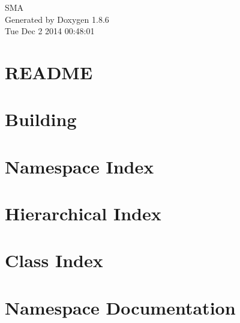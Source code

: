 \documentclass[twoside]{book}
\newcommand{\clearemptydoublepage}{%
  \newpage{\pagestyle{empty}\cleardoublepage}%
}
\begin{document}
\hypersetup{pageanchor=false}
\begin{titlepage}
\vspace*{7cm}
\begin{center}%
{\Large S\-M\-A }\\
\vspace*{1cm}
{\large Generated by Doxygen 1.8.6}\\
\vspace*{0.5cm}
{\small Tue Dec 2 2014 00:48:01}\\
\end{center}
\end{titlepage}
\clearemptydoublepage
\tableofcontents
\clearemptydoublepage
{}
\hypersetup{pageanchor=true}

\chapter{R\-E\-A\-D\-M\-E}
\label{md_ns3_README}
\hypertarget{md_ns3_README}{}

\chapter{Building}
\label{md_README}
\hypertarget{md_README}{}

\chapter{Namespace Index}

\chapter{Hierarchical Index}

\chapter{Class Index}

\chapter{Namespace Documentation}







\end{document}
